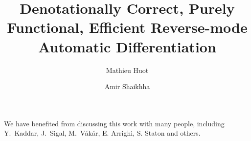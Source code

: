 \documentclass[acmsmall,anonymous]{acmart}\settopmatter{printfolios=true,printccs=false,printacmref=false}
\begin{document}
\title{Denotationally Correct, Purely Functional, Efficient Reverse-mode Automatic Differentiation}

\author{Mathieu Huot}

\author{Amir Shaikhha}

\renewcommand{\shortauthors}{Huot, et al.}




\maketitle

 
 



 

 

\begin{acks}
We have benefited from discussing this work with many people, including Y.~Kaddar, J.~Sigal, M.~V\'ak\'ar, E. Arrighi, S. Staton and others. 
\end{acks}



\appendix

 
\end{document}
